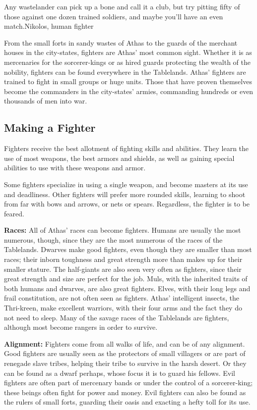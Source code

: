 {Any wastelander can pick up a bone and call it a club, but try pitting fifty of those against one dozen trained soldiers, and maybe you'll have an even match.}{Nikolos, human fighter}

From the small forts in sandy wastes of Athas to the guards of the merchant houses in the city-states, fighters are Athas' most common sight. Whether it is as mercenaries for the sorcerer-kings or as hired guards protecting the wealth of the nobility, fighters can be found everywhere in the Tablelands. Athas' fighters are trained to fight in small groups or huge units. Those that have proven themselves become the commanders in the city-states' armies, commanding hundreds or even thousands of men into war.

\subsection{Making a Fighter}
Fighters receive the best allotment of fighting skills and abilities. They learn the use of most weapons, the best armors and shields, as well as gaining special abilities to use with these weapons and armor.

Some fighters specialize in using a single weapon, and become masters at its use and deadliness. Other fighters will prefer more rounded skills, learning to shoot from far with bows and arrows, or nets or spears. Regardless, the fighter is to be feared.

\textbf{Races:} All of Athas' races can become fighters. Humans are usually the most numerous, though, since they are the most numerous of the races of the Tablelands. Dwarves make good fighters, even though they are smaller than most races; their inborn toughness and great strength more than makes up for their smaller stature. The half-giants are also seen very often as fighters, since their great strength and size are perfect for the job. Muls, with the inherited traits of both humans and dwarves, are also great fighters. Elves, with their long legs and frail constitution, are not often seen as fighters. Athas' intelligent insects, the Thri-kreen, make excellent warriors, with their four arms and the fact they do not need to sleep. Many of the savage races of the Tablelands are fighters, although most become rangers in order to survive.

\textbf{Alignment:} Fighters come from all walks of life, and can be of any alignment. Good fighters are usually seen as the protectors of small villagers or are part of renegade slave tribes, helping their tribe to survive in the harsh desert. Or they can be found as a dwarf perhaps, whose focus it is to guard his fellows. Evil fighters are often part of mercenary bands or under the control of a sorcerer-king; these beings often fight for power and money. Evil fighters can also be found as the rulers of small forts, guarding their oasis and exacting a hefty toll for its use.

